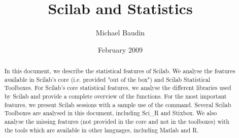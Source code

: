 \documentclass[12pt]{report}
\begin{document}
\author{Michael Baudin}
\date{February 2009}
\title{Scilab and Statistics}
\begin{abstract}
In this document, we describe the statistical features of Scilab.
We analyse the features available in Scilab's core (i.e. provided
"out of the box") and Scilab Statistical Toolboxes.
For Scilab's core statistical features, we analyse the different
libraries used by Scilab and provide a complete overview of 
the functions. For the most important features, we present Scilab 
sessions with a sample use of the command. Several Scilab Toolboxes
are analysed in this document, including Sci\_R and Stixbox.
We also analyse the missing features (not provided in the core and not in the 
toolboxes) with the tools which are available in other languages,
including Matlab and R.
\end{abstract}

\maketitle

\tableofcontents






\clearpage





\end{document}
